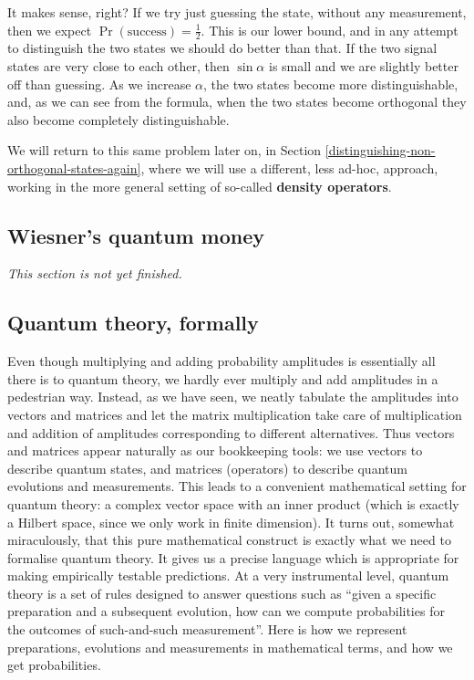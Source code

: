 \documentclass[fleqn,a4paper]{article}
\newenvironment{todo}{\color{primary}\emph{This section is not yet finished.}}{}
\theoremstyle{definition}
\theoremstyle{definition}
\theoremstyle{definition}
\theoremstyle{definition}
\theoremstyle{remark}
\begin{document}
It makes sense, right?
If we try just guessing the state, without any measurement, then we expect \(\Pr (\text{success}) = \frac{1}{2}\).
This is our lower bound, and in any attempt to distinguish the two states we should do better than that.
If the two signal states are very close to each other, then \(\sin\alpha\) is small and we are slightly better off than guessing.
As we increase \(\alpha\), the two states become more distinguishable, and, as we can see from the formula, when the two states become orthogonal they also become completely distinguishable.

We will return to this same problem later on, in Section \ref{distinguishing-non-orthogonal-states-again}, where we will use a different, less ad-hoc, approach, working in the more general setting of so-called \textbf{density operators}.

\hypertarget{wiesners-quantum-money}{%
\subsection{Wiesner's quantum money}\label{wiesners-quantum-money}}

\begin{todo}

\end{todo}

\hypertarget{quantum-theory-formally}{%
\subsection{Quantum theory, formally}\label{quantum-theory-formally}}

Even though multiplying and adding probability amplitudes is essentially all there is to quantum theory, we hardly ever multiply and add amplitudes in a pedestrian way.
Instead, as we have seen, we neatly tabulate the amplitudes into vectors and matrices and let the matrix multiplication take care of multiplication and addition of amplitudes corresponding to different alternatives.
Thus vectors and matrices appear naturally as our bookkeeping tools: we use vectors to describe quantum states, and matrices (operators) to describe quantum evolutions and measurements.
This leads to a convenient mathematical setting for quantum theory: a complex vector space with an inner product (which is exactly a Hilbert space, since we only work in finite dimension).
It turns out, somewhat miraculously, that this pure mathematical construct is exactly what we need to formalise quantum theory.
It gives us a precise language which is appropriate for making empirically testable predictions.
At a very instrumental level, quantum theory is a set of rules designed to answer questions such as ``given a specific preparation and a subsequent evolution, how can we compute probabilities for the outcomes of such-and-such measurement''.
Here is how we represent preparations, evolutions and measurements in mathematical terms, and how we get probabilities.
\end{document}
